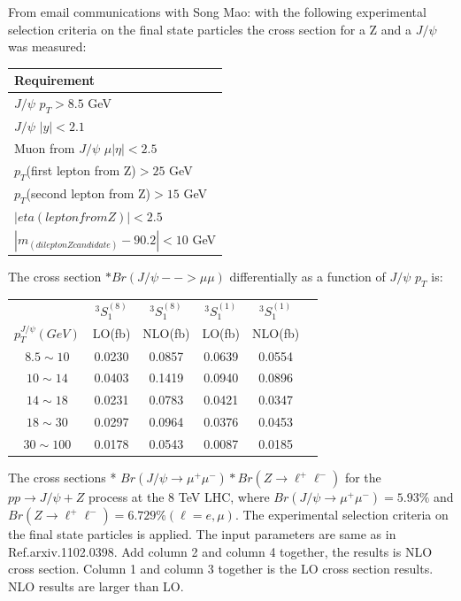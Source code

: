 \documentclass[a4paper,12pt]{article}
\begin{document}
From email communications with Song Mao: with the following experimental selection criteria on the final state particles the cross section for a Z and a $J\slash \psi$ was measured: 
\begin{center}
  \begin{tabular}{ | l | }
    \hline
    Requirement \\ \hline
    $J\slash \psi$ $p_T > 8.5$ \unit{GeV} \\ \hline
    $J\slash \psi$ $|y|<2.1$  \\ \hline
    Muon from $J\slash \psi$ $\mu |\eta| < 2.5$ \\ \hline
    $p_T$(first lepton from Z)$>25$ \unit{GeV} \\ \hline
    $p_T$(second lepton from Z)$> 15$ \unit{GeV}\\ \hline
    $|eta(lepton from Z)|<2.5$ \\ \hline
    $|m_(dilepton Z candidate)-90.2|< 10 $ \unit{GeV} \\ \hline
    \hline
  \end{tabular}
\end{center}
The cross section $*Br(J \slash \psi --> \mu\mu)$ differentially as a function of $J\slash \psi$ $p_T$ is:
\begin{center}
\begin{tabular}{cccccc}
                    &$^3S_1^{(8)}$ & $^3S_1^{(8)}$ & $^3S_1^{(1)}$  & $^3S_1^{(1)}$  \\
$p_T^{J/\psi}(GeV)$ &LO(fb)  &NLO(fb)&LO(fb)  &NLO(fb)        \\
\hline
    $8.5 \sim 10$   &0.0230  &0.0857 &0.0639  &0.0554    &    \\
    $10  \sim 14$   &0.0403  &0.1419 &0.0940  &0.0896    &    \\
    $14  \sim 18$   &0.0231  &0.0783 &0.0421  &0.0347    &    \\
    $18  \sim 30$   &0.0297  &0.0964 &0.0376  &0.0453    &    \\
    $30  \sim 100$  &0.0178  &0.0543 &0.0087  &0.0185    &    \\
\end{tabular}
\end{center}
The cross sections * $Br(J/\psi \to \mu^+\mu^-)*Br(Z \to \ell^+\ell^-)$ for the $pp \to J/\psi+Z$ process at the 8 \unit{TeV} LHC, where $Br(J/\psi \to \mu^+\mu^-) =5.93\% $ and $Br(Z \to \ell^+\ell^-) =6.729\% (\ell = e,\mu)$. The experimental selection criteria on the final state particles is applied. The input parameters are same as in Ref.arxiv.1102.0398. Add column 2 and column 4 together, the results is NLO cross section. Column 1 and column 3 together is the LO cross section results. NLO results are larger than LO.
\end{document}
